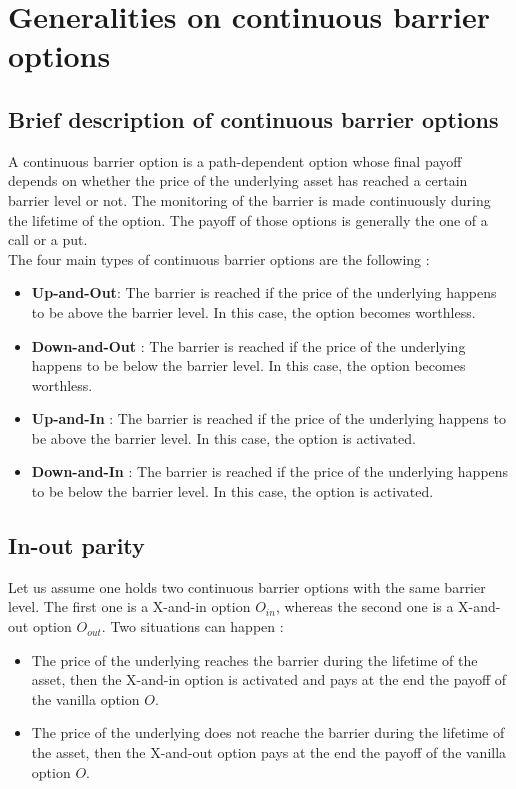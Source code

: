 \documentclass[a4paper,11pt,english]{book}
\begin{document}
\section{Generalities on continuous barrier options}
\label{appendix:down-in-put}

\subsection{Brief description of continuous barrier options}
A continuous barrier option is a path-dependent option whose final payoff depends on whether the price of the underlying asset has reached a certain barrier level or not. The monitoring of the barrier is made continuously during the lifetime of the option. The payoff of those options is generally the one of a call or a put.\\

The four main types of continuous barrier options are the following :
\begin{itemize}
    \item \textbf{Up-and-Out}: The barrier is reached if the price of the underlying happens to be above the barrier level. In this case, the option becomes worthless.
    \item \textbf{Down-and-Out} : The barrier is reached if the price of the underlying happens to be below the barrier level. In this case, the option becomes worthless.
    \item \textbf{Up-and-In} : The barrier is reached if the price of the underlying happens to be above the barrier level. In this case, the option is activated.
    \item \textbf{Down-and-In} : The barrier is reached if the price of the underlying happens to be below the barrier level. In this case, the option is activated.
\end{itemize}

\subsection{In-out parity}
Let us assume one holds two continuous barrier options with the same barrier level. The first one is a X-and-in option $O_{in}$, whereas the second one is a X-and-out option $O_{out}$. Two situations can happen : 
\begin{itemize}
    \item The price of the underlying reaches the barrier during the lifetime of the asset, then the X-and-in option is activated and pays at the end the payoff of the vanilla option $O$.
    \item The price of the underlying does not reache the barrier during the lifetime of the asset, then the X-and-out option pays at the end the payoff of the vanilla option $O$.
\end{itemize}
\end{document}
